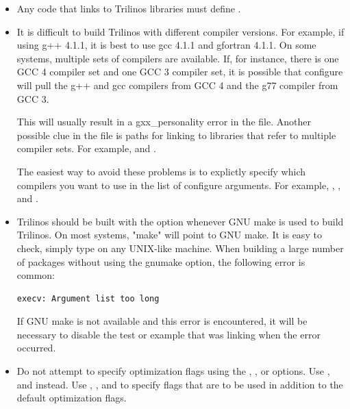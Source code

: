 \begin{itemize}

\item Any code that links to Trilinos libraries must define
.

\item It is difficult to build Trilinos with different compiler versions.
For example, if using g++ 4.1.1, it is best to use gcc 4.1.1 and gfortran
4.1.1.  On some systems, multiple sets of compilers are available.  If,
for instance, there is one GCC 4 compiler set and one GCC 3 compiler set,
it is possible that configure will pull the g++ and gcc compilers from
GCC 4 and the g77 compiler from GCC 3.

This will usually result in a gxx\_personality error in the \newline
{} file.  Another possible
clue in the  file is paths for linking to
libraries that refer to multiple compiler sets.  For example,
 and
\newline {}.

The easiest way to avoid these problems is to explictly specify
which compilers you want to use in the list of configure arguments.
For example, \newline {},
, and .

\item Trilinos should be built with the 
option whenever GNU make is used to build Trilinos.  On most systems,
"make" will point to GNU make.  It is easy to check, simply type
 on any UNIX-like machine.  When building a
large number of packages without using the gnumake option, the
following error is common:

\begin{verbatim}
execv: Argument list too long
\end{verbatim}

If GNU make is not available and this error is encountered, it will
be necessary to disable the test or example that was linking when
the error occurred.



\item Do not attempt to specify optimization flags using the
, , or
 options.   Use ,
 and  instead.  Use
, , and
 to specify flags that are to be used in
addition to the default optimization flags.


\end{itemize}
